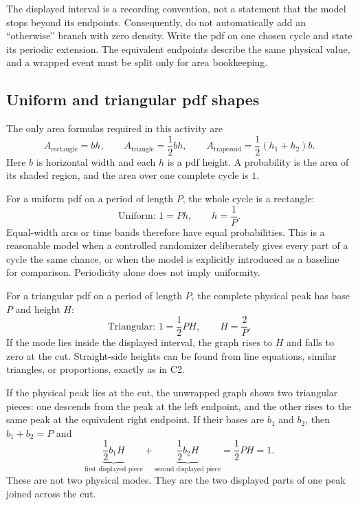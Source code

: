 	The displayed interval is a recording convention, not a statement that the
	model stops beyond its endpoints.  Consequently, do not automatically add an
	``otherwise'' branch with zero density.  Write the pdf on one chosen cycle and
	state its periodic extension.  The equivalent endpoints describe the same
	physical value, and a wrapped event must be split only for area bookkeeping.
	
	\subsection{Uniform and triangular pdf shapes}\label{sec:c3-intro-shapes}
	The only area formulas required in this activity are
	\[
	A_{\text{rectangle}}=bh,\qquad
	A_{\text{triangle}}=\frac12bh,\qquad
	A_{\text{trapezoid}}=\frac12(h_1+h_2)b.
	\]
	Here $b$ is horizontal width and each $h$ is a pdf height.  A probability is
	the area of its shaded region, and the area over one complete cycle is $1$.
	
	For a uniform pdf on a period of length $P$, the whole cycle is a rectangle:
	\[
	\text{Uniform: }1=Ph,\qquad h=\frac1P.
	\]
	Equal-width arcs or time bands therefore have equal probabilities.  This is a
	reasonable model when a controlled randomizer deliberately gives every part
	of a cycle the same chance, or when the model is explicitly introduced as a
	baseline for comparison.  Periodicity alone does not imply uniformity.
	
	For a triangular pdf on a period of length $P$, the complete physical peak has
	base $P$ and height $H$:
	\[
	\text{Triangular: }1=\frac12PH,\qquad H=\frac2P.
	\]
	If the mode lies inside the displayed interval, the graph rises to $H$ and
	falls to zero at the cut.  Straight-side heights can be found from line
	equations, similar triangles, or proportions, exactly as in C2.
	
	If the physical peak lies at the cut, the unwrapped graph shows two triangular
	pieces: one descends from the peak at the left endpoint, and the other rises
	to the same peak at the equivalent right endpoint.  If their bases are
	$b_1$ and $b_2$, then $b_1+b_2=P$ and
	\[
	\underbrace{\frac12b_1H}_{\text{first displayed piece}}
	+\underbrace{\frac12b_2H}_{\text{second displayed piece}}
	=\frac12PH=1.
	\]
	These are not two physical modes.  They are the two displayed parts of one
	peak joined across the cut.
	
